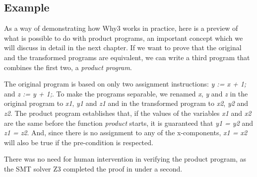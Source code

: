 \subsection{Example}
\label{subsec:why3_example}

As a way of demonstrating how Why3 works in practice, here is a preview of what is possible to do with product programs, an important concept which we will discuss in detail in the next chapter.
If we want to prove that the original and the transformed programs are equivalent, we can write a third program that combines the first two, a \emph{product program}.

The original program is based on only two assignment instructions: \emph{y := x + 1;} and \emph{z := y + 1;}.
To make the programs separable, we renamed \emph{x}, \emph{y} and \emph{z} in the original program to \emph{x1}, \emph{y1} and \emph{z1} and in the transformed program to \emph{x2}, \emph{y2} and \emph{z2}.
The product program establishes that, if the values of the variables \emph{x1} and \emph{x2} are the same before the function \emph{product} starts, it is guaranteed that \emph{y1 = y2} and \emph{z1 = z2}.
And, since there is no assignment to any of the x-components, \emph{x1 = x2} will also be true if the pre-condition is respected.

There was no need for human intervention in verifying the product program, as the SMT solver Z3 completed the proof in under a second.

